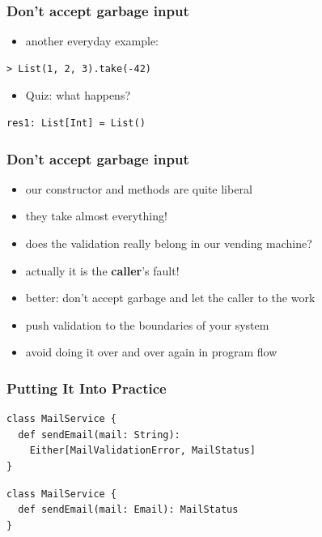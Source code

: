 \documentclass{beamer}
\begin{document}
\begin{frame}
  \frametitle{Don't accept garbage input}
  \begin{itemize}
  \item another everyday example:
  \end{itemize}
  \begin{center}
\begin{verbatim}
> List(1, 2, 3).take(-42)
\end{verbatim}
  \end{center}
  \begin{itemize}
  \item Quiz: what happens?
  \end{itemize}
\begin{verbatim}
res1: List[Int] = List()
\end{verbatim}
\end{frame}

\begin{frame}
  \frametitle{Don't accept garbage input}
  \begin{itemize}
    
  \item our constructor and methods are quite liberal
  \item they take almost everything!
  \item does the validation really belong in our vending machine?
  \item actually it is the \textbf{caller}'s fault!
  \item better: don't accept garbage and let the caller to the work
  \item push validation to the boundaries of your system
  \item avoid doing it over and over again in program flow
  \end{itemize}
\end{frame}

\begin{frame}
  \frametitle{Putting It Into Practice}
\begin{verbatim}
class MailService {
  def sendEmail(mail: String): 
    Either[MailValidationError, MailStatus]
}
\end{verbatim}

\begin{verbatim}
class MailService {
  def sendEmail(mail: Email): MailStatus
}
\end{verbatim}
\end{frame}
\end{document}

